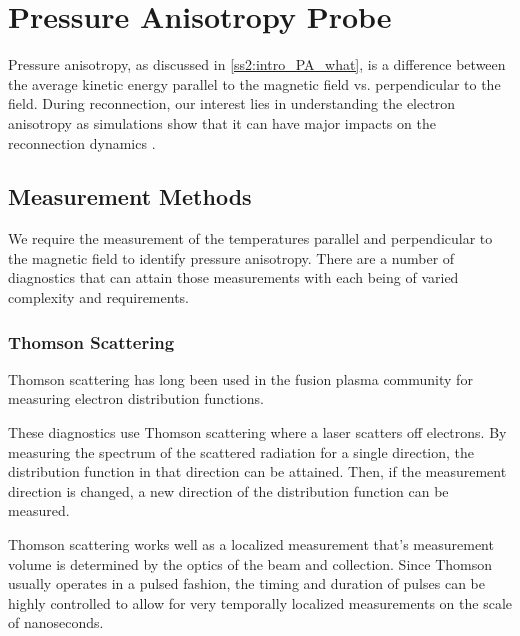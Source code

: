 \chapter{Pressure Anisotropy Probe}
\label{sch:pa_probe}

Pressure anisotropy, as discussed in \ref{ss2:intro_PA_what}, is a difference between the average kinetic energy parallel to the magnetic field vs. perpendicular to the field. During reconnection, our interest lies in understanding the electron anisotropy as simulations show that it can have major impacts on the reconnection dynamics \cite{Ohia_Egedal_Lukin_Daughton_Le_2012}.

\section{Measurement Methods}

We require the measurement of the temperatures parallel and perpendicular to the magnetic field to identify pressure anisotropy. There are a number of diagnostics that can attain those measurements with each being of varied complexity and requirements.

\subsection{Thomson Scattering}

Thomson scattering has long been used in the fusion plasma community for measuring electron distribution functions.


These diagnostics use Thomson scattering where a laser scatters off electrons. By measuring the spectrum of the scattered radiation for a single direction, the distribution function in that direction can be attained. Then, if the measurement direction is changed, a new direction of the distribution function can be measured.

Thomson scattering works well as a localized measurement that's measurement volume is determined by the optics of the beam and collection.%
Since Thomson usually operates in a pulsed fashion, the timing and duration of pulses can be highly controlled to allow for very temporally localized measurements on the scale of nanoseconds. %

